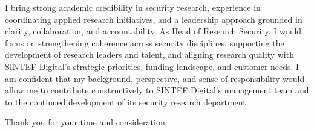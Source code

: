 I bring strong academic credibility in security research, experience in coordinating applied research initiatives, and a leadership approach grounded in clarity, collaboration, and accountability. As Head of Research Security, I would focus on strengthening coherence across security disciplines, supporting the development of research leaders and talent, and aligning research quality with SINTEF Digital’s strategic priorities, funding landscape, and customer needs. I am confident that my background, perspective, and sense of responsibility would allow me to contribute constructively to SINTEF Digital’s management team and to the continued development of its security research department.

Thank you for your time and consideration.